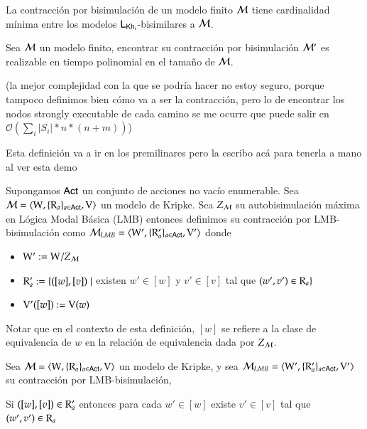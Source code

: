 \begin{teorema}
    La contracción por bisimulación de un modelo finito $\mathcal{M}$ tiene cardinalidad mínima entre los modelos $\mathsf{L}_{\mathsf{Kh}_i}$-bisimilares a $\mathcal{M}$.
\end{teorema}



\begin{teorema}
    Sea $\mathcal{M}$ un modelo finito, encontrar su contracción por bisimulación $\mathcal{M}'$ es realizable en tiempo polinomial en el tamaño de $\mathcal{M}$.
\end{teorema}

(la mejor complejidad con la que se podría hacer no estoy seguro, porque tampoco definimos bien cómo va a ser la contracción, pero lo de encontrar los nodos strongly executable de cada camino se me ocurre que puede salir en $\mathcal{O}(\sum_{i} |S_i|*n*(n+m))$)


Esta definición va a ir en los premilinares pero la escribo acá para tenerla a mano al ver esta demo
\begin{definicion}
    Supongamos ${\rm \sf Act}$ un conjunto de acciones no vacío enumerable.
    Sea $\mathcal{M} = \langle \mathrm{W},\{\mathrm{R}_a\}_{a\in{\rm \sf Act}},\mathrm{V} \rangle$ un modelo de Kripke. Sea $Z_{\mathcal{M}}$ su autobisimulación máxima en Lógica Modal Básica (LMB) entonces definimos su contracción por LMB-bisimulación como $\mathcal{M}_{LMB} = \langle \mathrm{W}',\{\mathrm{R}'_a\}_{a\in{\rm \sf Act}},\mathrm{V}' \rangle$ donde
    \begin{center}
        \begin{itemize}
            \item $\mathrm{W}' := \mathrm{W} /Z_{\mathcal{M}}$
            \item $\mathrm{R}_a' := \{([w],[v]) \mid$ existen $w' \in [w]$ y $v' \in [v]$ tal que $(w',v') \in \mathrm{R}_a \}$
            \item $\mathrm{V}'([w]) := \mathrm{V}(w)$
        \end{itemize}
    \end{center} 
\end{definicion}

Notar que en el contexto de esta definición, $[w]$ se refiere a la clase de equivalencia de $w$ en la relación de equivalencia dada por $Z_{\mathcal{M}}$. 


\begin{lema}
    Sea $\mathcal{M} = \langle \mathrm{W},\{\mathrm{R}_a\}_{a\in{\rm \sf Act}},\mathrm{V} \rangle$ un modelo de Kripke, y sea $\mathcal{M}_{LMB} = \langle \mathrm{W}',\{\mathrm{R}_a'\}_{a\in{\rm \sf Act}},\mathrm{V}' \rangle$ su contracción por LMB-bisimulación,
    \begin{center}
        Si $([w],[v]) \in \mathrm{R}'_a$ entonces para cada $w' \in [w]$ existe $v' \in [v]$ tal que $(w',v') \in \mathrm{R}_a$
    \end{center}
\end{lema}



